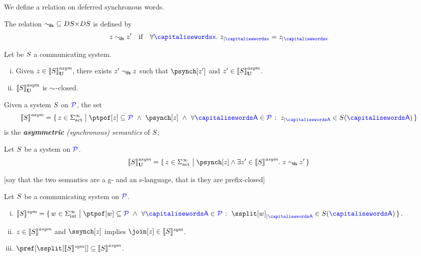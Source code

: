   We define a relation on deferred synchronous words.
\begin{definition}[$\commds$]
The relation $\sim_{\!\mathsf{ds}}\ \subseteq DS{\times}DS$ is defined by
$$z\commds z'  \quad \text{if} \quad \forall \px.\ \filter{z}{\px}=\filter{z}{\px}$$
\end{definition}

  
\begin{lemma}
Let be $S$ a communicating system.
\begin{enumerate}[i)]
\item
Given $z\in {\llbracket S\rrbracket}^{\textit{asym}}_{\mathbf{U}}$, there exists $z'\sim_{\!\mathsf{ds}} z$ such that $\psynch[z']$ and $z'\in {\llbracket S\rrbracket}^{\textit{asym}}_{\mathbf{U}}$.
\item
${\llbracket S \rrbracket}^{\textit{asym}}_{\mathbf{U}}$ is $\sim$-closed.
\end{enumerate}
\end{lemma}
 

\begin{definition}\label{def:syncSem}
  Given a system $S$ on $\mathcal{\color{blue}{P}}$, the set
  \[
	 \asem{\aCS} = \Set{z \in \alfact^\infty \sst \ptpof[z] \subseteq \ptpset \ \land\ \psynch[z]\  \land\ \forall \p \in
		\ptpset \qst \filter{z}{\p} \in \aCS(\p)  }
  \]
  is the \emph{{\bf asymmetric} (synchronous) semantics} of $S$;
\end{definition}

\begin{lemma}
Let $S$ be a system on $\mathcal{\color{blue}{P}}$.
$$\gasem{\aCS} = \Set{z\in\alfact^\infty \sst  \psynch[z] \land \exists z'\in\asem{\aCS}.\  z\commds z'}$$ 
\end{lemma}

[say that the two semantics are a g- and an s-language, that is they are prefix-closed]

\begin{lemma}
\label{fac:asymmsubsymm}
Let  $S$ be a communicating system on $\mathcal{\color{blue}{P}}$.
\begin{enumerate}[i)]
\item
$\ssem{\aCS} =  
\Set{\acword \in \alfint^\infty \sst  
\ptpof[\acword] \subseteq \ptpset \ \land\ \forall \p \in \ptpset \qst \filter{\ssplit[\acword]}{\p} \in \aCS(\p)}$.
\item
\label{fac:asymmsubsymm-aimps}
$z\in{\llbracket S\rrbracket}^{\textit{asym}}$ and $\ssynch[z]$ implies $\join[z]\in\ssem{\aCS}$.
\item
\label{fac:asymmsubsymm-asubs}
$\pref[{\ssplit[{\ssem{\aCS}}]}] \subseteq \asem{\aCS}$.
\end{enumerate}
\end{lemma}

